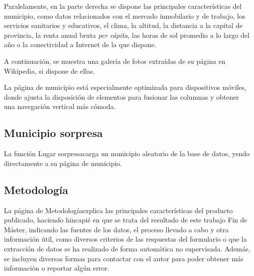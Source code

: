 Paralelamente, en la parte derecha se dispone las principales características del municipio, como datos relacionados con el mercado inmobilario y de trabajo, los servicios sanitarios y educativos, el clima, la altitud, la distancia a la capital de provincia, la renta anual bruta \textit{per cápita}, las horas de sol promedio a lo largo del año o la conectividad a Internet de la que dispone.

A continuación, se muestra una galería de fotos extraídas de su página en Wikipedia, si dispone de ellas.

La página de municipio está especialmente optimizada para dispositivos móviles, donde ajusta la disposición de elementos para fusionar las columnas y obtener una navegación vertical más cómoda.


\subsection{Municipio sorpresa}

La función \guillemotleft Lugar sorpresa\guillemotright\space carga un municipio aleatorio de la base de datos, yendo directamente a su página de municipio.

\subsection{Metodología}

La página de \guillemotleft Metodología\guillemotright\space explica las principales características del producto publicado, haciendo hincapié en que se trata del resultado de este trabajo Fin de Máster, indicando las fuentes de los datos, el proceso llevado a cabo y otra información útil, como diversos criterios de las respuestas del formulario o que la extracción de datos se ha realizado de forma automática no supervisada. Además, se incluyen diversas formas para contactar con el autor para poder obtener más información o reportar algún error.

